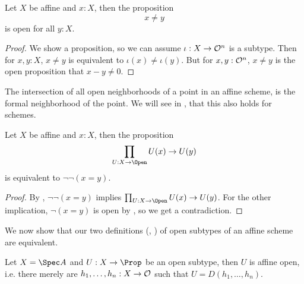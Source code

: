 \begin{lemma}%
  \label{open-inequality-subtype}
  Let $X$ be affine and $x:X$, then the proposition
  \[ x\neq y \]
  is open for all $y:X$.
\end{lemma}

\begin{proof}
  We show a proposition, so we can assume $\iota: X\to \mathcal O^n$ is a subtype.
  Then for $x,y:X$, $x\neq y$ is equivalent to $\iota(x)\neq\iota(y)$.
  But for $x,y:\mathcal O^n$, $x\neq y$ is the open proposition that $x-y\neq 0$.
\end{proof}

The intersection of all open neighborhoods of a point in an affine scheme,
is the formal neighborhood of the point.
We will see in , that this also holds for schemes.

\begin{lemma}%
  \label{affine-intersection-of-all-opens}
  Let $X$ be affine and $x:X$, then the proposition
  \[ \prod_{U:X\to \Open}U(x)\to U(y) \]
  is equivalent to $\neg\neg (x=y)$.
\end{lemma}

\begin{proof}
  By , $\neg\neg (x=y)$ implies $\prod_{U:X\to \Open}U(x)\to U(y)$.
  For the other implication,
  $\neg (x=y)$ is open by , so we get a contradiction.
\end{proof}

We now show that our two definitions (, )
of open subtypes of an affine scheme are equivalent.

\begin{theorem}%
  \label{qc-open-affine-open}
  Let $X=\Spec A$ and $U:X\to\Prop$ be an open subtype,
  then $U$ is affine open, i.e. there merely are $h_1,\dots,h_n:X\to \mathcal O$ such that
  $U=D(h_1,\dots,h_n)$.
\end{theorem}

